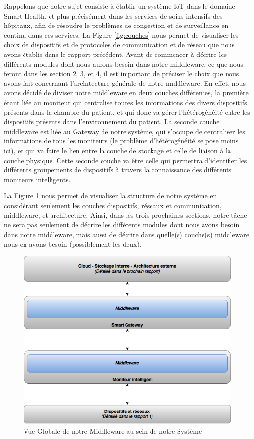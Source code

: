 Rappelons que notre sujet consiste à établir un système IoT dans le domaine Smart Health, et plus précisément dans les services de
soins intensifs des hôpitaux, afin de résoudre le problèmes de congestion et de surveillance en continu dans ces services. La Figure
\ref{fig:couches} nous permet de visualiser les choix de dispositifs et de protocoles de communication et de réseau que nous avons établis
dans le rapport précédent. Avant de commencer à décrire les différents modules dont nous aurons besoin dans notre middleware, ce que nous feront dans les section 2, 3, et 4, il est important de préciser le choix que nous avons fait concernant l’architecture générale de notre middleware. En effet, nous avons décidé de diviser notre middleware en deux couches différentes, la première étant liée au moniteur qui centralise toutes les informations des divers dispositifs présents dans la chambre du patient, et qui donc va gérer l’hétérogénéité entre les dispositifs présents dans l’environnement du patient. La seconde couche middleware est liée au Gateway de notre système, qui s’occupe de centraliser les informations de tous les moniteurs (le problème d’hétérogénéité se pose moins ici), et qui va faire le lien entre la couche de stockage et celle de liaison à la couche physique. Cette seconde couche va être celle qui permettra d’identifier les différents groupements de dispositifs à travers la connaissance des différents moniteurs intelligents.

La Figure \ref{fig:vueglobale} nous permet de visualiser la structure de notre système en considérant seulement les couches dispositifs, réseaux et communication, middleware, et architecture. Ainsi, dans les trois prochaines sections, notre tâche ne sera pas seulement de décrire les différents modules dont nous avons besoin dans notre middleware, mais aussi de décrire dans quelle(s) couche(s) middleware nous en avons besoin (possiblement les deux).

\begin{figure}[h!]
	\hspace*{-2.5cm}
	\centering
	\includegraphics[width=1.4\textwidth]{Figure2.png}
	\caption{Vue Globale de notre Middleware au sein de notre Système}
	\label{fig:vueglobale}
\end{figure}
